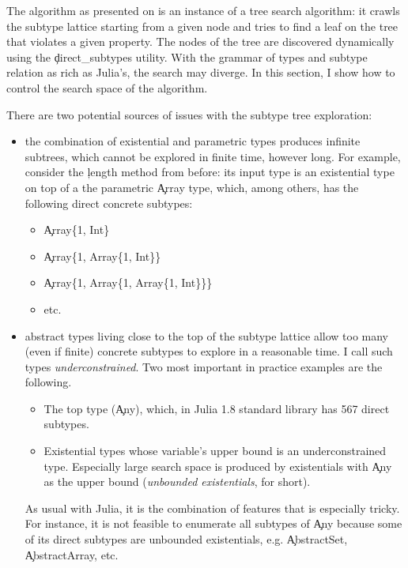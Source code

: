 The algorithm as presented on  is an instance of a tree
search algorithm: it crawls the subtype lattice starting from a given node and
tries to find a leaf on the tree that violates a given property. The nodes of
the tree are discovered dynamically using the \c{direct_subtypes} utility.
%
With the grammar of types and subtype relation as rich as Julia's, the search
may diverge. In this section, I show how to control the search space of the
algorithm.

There are two potential sources of issues with the subtype tree exploration:
\begin{itemize}

  \item the combination of existential and parametric types produces infinite
  subtrees, which cannot be explored in finite time, however long.
  For example, consider the
  \c{length} method from before: its input type is an existential type on top
  of a the parametric \c{Array} type, which,
  among others, has the following direct concrete subtypes:
  \begin{itemize}
    \item \c{Array\{1, Int\}}
    \item \c{Array\{1, Array\{1, Int\}\}}
    \item \c{Array\{1, Array\{1, Array\{1, Int\}\}\}}
    \item etc.
  \end{itemize}

  \item abstract types living close to the top of the subtype lattice allow too
  many (even if finite) concrete subtypes to explore in a reasonable time. I
  call such types \emph{underconstrained}. Two most important in practice
  examples are the following.
  \begin{itemize}
    \item
    The top type (\c{Any}),
    which, in Julia 1.8 standard library has 567 direct subtypes.

    \item
    Existential types whose variable's upper bound is an underconstrained type.
    Especially large search space is produced by existentials with \c{Any} as the upper
    bound (\emph{unbounded existentials}, for short).

  \end{itemize}
  As usual with Julia, it is the combination of features that is especially
  tricky. For instance,
  it is not feasible to enumerate all subtypes of \c{Any} because some of its direct subtypes
  are unbounded existentials, e.g. \c{AbstractSet}, \c{AbstractArray}, etc.

\end{itemize}

